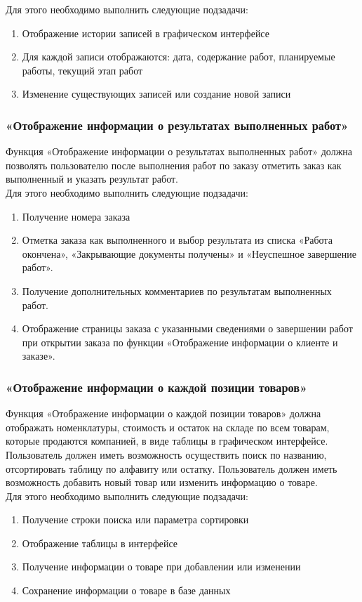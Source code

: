 \documentclass[a4paper,12pt]{article}
\begin{document}
Для этого необходимо выполнить следующие подзадачи:
\begin{enumerate}
    \item Отображение истории записей в графическом интерфейсе
    \item Для каждой записи отображаются: дата, содержание работ, планируемые работы, текущий этап работ
    \item Изменение существующих записей или создание новой записи
\end{enumerate}

\subsubsection{«Отображение информации о результатах выполненных работ»}
Функция «Отображение информации о результатах выполненных работ» должна позволять пользователю после выполнения работ по заказу отметить заказ как выполненный и указать результат работ.\\

Для этого необходимо выполнить следующие подзадачи:
\begin{enumerate}
    \item Получение номера заказа
    \item Отметка заказа как выполненного и выбор результата из списка «Работа окончена», «Закрывающие документы получены» и «Неуспешное завершение работ».
    \item Получение дополнительных комментариев по результатам выполненных работ.
    \item Отображение страницы заказа с указанными сведениями о завершении работ при открытии заказа по функции «Отображение информации о клиенте и заказе».
\end{enumerate}

\subsubsection{«Отображение информации о каждой позиции товаров»}
Функция «Отображение информации о каждой позиции товаров» должна отображать номенклатуры, стоимость и остаток на складе по всем товарам, которые продаются компанией, в виде таблицы в графическом интерфейсе. Пользователь должен иметь возможность осуществить поиск по названию, отсортировать таблицу по алфавиту или остатку. Пользователь должен иметь возможность добавить новый товар или изменить информацию о товаре.\\

Для этого необходимо выполнить следующие подзадачи:
\begin{enumerate}
    \item Получение строки поиска или параметра сортировки
    \item Отображение таблицы в интерфейсе
    \item Получение информации о товаре при добавлении или изменении
    \item Сохранение информации о товаре в базе данных
\end{enumerate}
\end{document}
